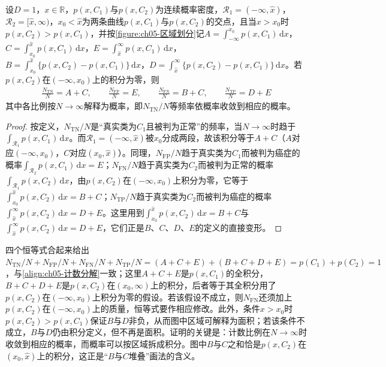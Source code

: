 \documentclass[../../main.tex]{subfiles}
\begin{document}
\begin{proposition}[区域面积与计数比例的关系]\label{proposition:ch05-面积恒等式}
设$D=1$，$x\in\mathbb{R}$，$p(x,C_1)$与$p(x,C_2)$为连续概率密度，$\mathcal{R}_1=(-\infty,\hat{x})$，$\mathcal{R}_2=[\hat{x},\infty)$，$x_0<\hat{x}$为两条曲线$p(x,C_1)$与$p(x,C_2)$的交点，且当$x>x_0$时$p(x,C_2)>p(x,C_1)$，并按\cref{figure:ch05-区域划分}记$A=\int_{-\infty}^{x_0}p(x,C_1)\,\mathrm{d}x$，$C=\int_{x_0}^{\hat{x}}p(x,C_1)\,\mathrm{d}x$，$E=\int_{\hat{x}}^{\infty}p(x,C_1)\,\mathrm{d}x$，$B=\int_{x_0}^{\hat{x}}\{p(x,C_2)-p(x,C_1)\}\,\mathrm{d}x$，$D=\int_{\hat{x}}^{\infty}\{p(x,C_2)-p(x,C_1)\}\,\mathrm{d}x$。若$p(x,C_2)$在$(-\infty,x_0)$上的积分为零，则
\begin{align}
  \frac{N_{\mathrm{TN}}}{N}=A+C,\qquad
  \frac{N_{\mathrm{FP}}}{N}=E,\qquad
  \frac{N_{\mathrm{FN}}}{N}=B+C,\qquad
  \frac{N_{\mathrm{TP}}}{N}=D+E
\end{align}
其中各比例按$N\to\infty$解释为概率，即$N_{\mathrm{TN}}/N$等频率依概率收敛到相应的概率。
\end{proposition}

\begin{proof}
按定义，$N_{\mathrm{TN}}/N$是“真实类为$C_1$且被判为正常”的频率，当$N\to\infty$时趋于$\int_{\mathcal{R}_1}p(x,C_1)\,\mathrm{d}x$。而$\mathcal{R}_1=(-\infty,\hat{x})$被$x_0$分成两段，故该积分等于$A+C$（$A$对应$(-\infty,x_0)$，$C$对应$(x_0,\hat{x})$）。同理，$N_{\mathrm{FP}}/N$趋于真实类为$C_1$而被判为癌症的概率$\int_{\mathcal{R}_2}p(x,C_1)\,\mathrm{d}x=E$；$N_{\mathrm{FN}}/N$趋于真实类为$C_2$而被判为正常的概率$\int_{\mathcal{R}_1}p(x,C_2)\,\mathrm{d}x$，由$p(x,C_2)$在$(-\infty,x_0)$上积分为零，它等于$\int_{x_0}^{\hat{x}}p(x,C_2)\,\mathrm{d}x=B+C$；$N_{\mathrm{TP}}/N$趋于真实类为$C_2$而被判为癌症的概率$\int_{\hat{x}}^{\infty}p(x,C_2)\,\mathrm{d}x=D+E$。这里用到$\int_{x_0}^{\hat{x}}p(x,C_2)\,\mathrm{d}x=B+C$与$\int_{\hat{x}}^{\infty}p(x,C_2)\,\mathrm{d}x=D+E$，它们正是$B$、$C$、$D$、$E$的定义的直接变形。
\end{proof}

\begin{remark}
四个恒等式合起来给出$N_{\mathrm{TN}}/N+N_{\mathrm{FP}}/N+N_{\mathrm{FN}}/N+N_{\mathrm{TP}}/N=(A+C+E)+(B+C+D+E)=p(C_1)+p(C_2)=1$，与\eqref{align:ch05-计数分解}一致；这里$A+C+E$是$p(x,C_1)$的全积分，$B+C+D+E$是$p(x,C_2)$在$(x_0,\infty)$上的积分，后者等于其全积分用了$p(x,C_2)$在$(-\infty,x_0)$上积分为零的假设。若该假设不成立，则$N_{\mathrm{FN}}$还须加上$p(x,C_2)$在$(-\infty,x_0)$上的质量，恒等式要作相应修改。此外，条件$x>x_0$时$p(x,C_2)>p(x,C_1)$保证$B$与$D$非负，从而图中区域可解释为面积；若该条件不成立，$B$与$D$仍由积分定义，但不再是面积。证明的关键是：计数比例在$N\to\infty$时收敛到相应的概率，而概率可以按区域拆成积分。图中$B$与$C$之和恰是$p(x,C_2)$在$(x_0,\hat{x})$上的积分，这正是“$B$与$C$堆叠”画法的含义。
\end{remark}
\end{document}
